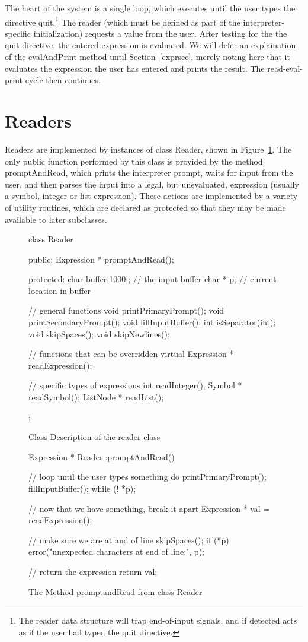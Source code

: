 The heart of the system is a single loop, which executes until the user
types the directive {\sf quit}.\footnote{The reader data structure will
trap end-of-input signals, and if detected acts as if the user had typed
the {\sf quit} directive.}  The reader (which must be defined as part of the
interpreter-specific initialization) requests a value from the user.
After testing for the the {\sf quit} directive, the entered expression is
evaluated.  We will defer an explaination of the {\sf evalAndPrint} method 
until Section~\ref{exprsec}, merely noting here that 
it evaluates the expression the user has entered and prints the result.
The read-eval-print cycle then continues.

\section{Readers}

Readers are implemented by instances of class {\sf Reader}, shown in
Figure~\ref{readerclass}.  The only public function performed by this class
is provided by the method {\sf promptAndRead}, which prints the interpreter
prompt, waits for input from the user, and then parses the input into a
legal, but unevaluated, expression (usually a symbol, integer or 
list-expression).  These actions are implemented by a variety of utility
routines, which are declared as {\sf protected} so that they may be
made available to later subclasses.

\begin{figure}
\begin{cprog}
class Reader {
public:
	Expression * promptAndRead();

protected:
	char buffer[1000];	// the input buffer
	char * p;		// current location in buffer

	// general functions
	void printPrimaryPrompt();
	void printSecondaryPrompt();
	void fillInputBuffer();
	int  isSeparator(int);
	void skipSpaces();
	void skipNewlines();

	// functions that can be overridden
	virtual Expression * readExpression();

	// specific types of expressions
	int readInteger();
	Symbol * readSymbol();
	ListNode * readList();
};
\end{cprog}
\caption{Class Description of the reader class}\label{readerclass}
\end{figure}

\begin{figure}
\begin{cprog}
Expression * Reader::promptAndRead()
{
	// loop until the user types something
	do {
		printPrimaryPrompt();
		fillInputBuffer();
		} while (! *p);

	// now that we have something, break it apart
	Expression * val = readExpression();

	// make sure we are at and of line
	skipSpaces();
	if (*p) {
		error("unexpected characters at end of line:", p);
		}

	// return the expression
	return val;
}
\end{cprog}
\caption{The Method {\sf promptandRead} from class {\sf Reader}}\label{promptAndRead}
\end{figure}

